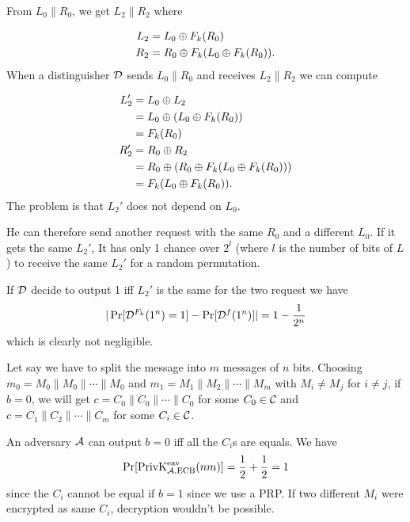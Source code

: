 \begin{solution}
  From $L_0\|R_0$, we get $L_2\|R_2$
  where

  \begin{align*}
    L_2 & = L_0 \oplus F_k(R_0)\\
    R_2 & = R_0 \oplus F_k(L_0 \oplus F_k(R_0)).
  \end{align*}
  When a distinguisher $\mathcal{D}$ sends $L_0\|R_0$ and receives
  $L_2\|R_2$ we can
  compute

  \begin{align*}
    L_2' & = L_0 \oplus L_2\\
         & = L_0 \oplus (L_0 \oplus F_k(R_0))\\
         & = F_k(R_0)\\
    R_2' & = R_0 \oplus R_2\\
         & = R_0 \oplus (R_0 \oplus F_k(L_0 \oplus F_k(R_0)))\\
         & = F_k(L_0 \oplus F_k(R_0)).
  \end{align*}
  The problem is that $L_2'$ does not depend on $L_0$.

  He can therefore send another request with the same $R_0$
  and a different $L_0$.
  If it gets the same $L_2'$,
  It has only 1 chance over $2^l$ (where $l$ is the number of bits of $L$) to receive the same $L_2'$ for a random permutation.

  If $\mathcal{D}$ decide to output 1 iff $L_2'$ is the same for the two request we have
  \[ |\Pr[\mathcal{D}^{F_k}(1^n) = 1] -\Pr[\mathcal{D}^f(1^n)]| = 1 - \frac{1}{2^n} \]
  which is clearly not negligible.
\end{solution}

\begin{solution}
  Let say we have to split the message into $m$ messages of $n$ bits.
  Choosing $m_0 = M_0 \| M_0 \| \cdots \| M_0$ and $m_1 = M_1 \| M_2 \| \cdots \| M_m$ with $M_i \neq M_j$ for $i \neq j$,
  if $b = 0$, we will get $c = C_0 \| C_0 \| \cdots \| C_0$ for some $C_0 \in \mathcal{C}$ and $c = C_1 \| C_2 \| \cdots \| C_m$ for some $C_i \in \mathcal{C}$.

  An adversary $\mathcal{A}$ can output $b = 0$ iff all the $C_i$s are equals.
  We have
  \[ \Pr[\operatorname{PrivK}^{\text{eav}}_{\mathcal{A},\text{ECB}}(nm)] = \frac{1}{2} + \frac{1}{2} = 1 \]
  since the $C_i$ cannot be equal if $b = 1$ since we use a PRP.
  If two different $M_i$ were encrypted as same $C_i$, decryption wouldn't be possible.
\end{solution}

